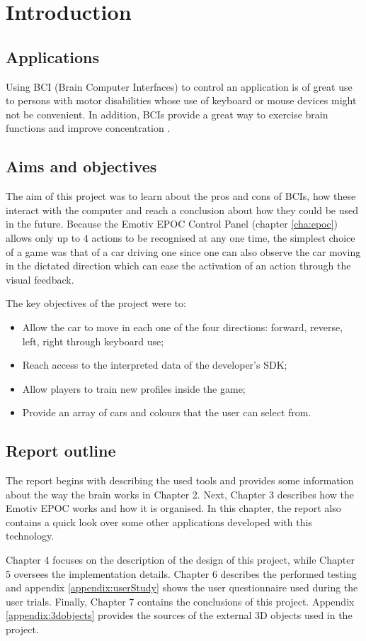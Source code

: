 \chapter{Introduction}
\label{cha:intro}

\section{Applications}

Using BCI (Brain Computer Interfaces) to control an application is of great use to persons with motor disabilities whose use of keyboard or mouse devices might not be convenient. In addition,  BCIs provide a great way to exercise brain functions and improve concentration \cite{adhd}.

\section{Aims and objectives}

The aim of this project was to learn about the pros and cons of BCIs, how these interact with the computer and reach a conclusion about how they could be used in the future. Because the Emotiv EPOC Control Panel (chapter \ref{cha:epoc}) allows only up to 4 actions to be recognised at any one time, the simplest choice of a game was that of a car driving one since one can also observe the car moving in the dictated direction which can ease the activation of an action through the visual feedback.

The key objectives of the project were to:
\begin{itemize}
	\item Allow the car to move in each one of the four directions: forward, reverse, left, right through keyboard use; 
	\item Reach access to the interpreted data of the developer's SDK;
	\item Allow players to train new profiles inside the game;
	\item Provide an array of cars and colours that the user can select from.
\end{itemize}

\section{Report outline}

The report begins with describing the used tools and provides some information about the way the brain works in Chapter 2. Next, Chapter 3 describes how the Emotiv EPOC works and how it is organised. In this chapter, the report also contains a quick look over some other applications developed with this technology.

Chapter 4 focuses on the description of the design of this project, while Chapter 5 oversees the implementation details. Chapter 6 describes the performed testing and appendix \ref{appendix:userStudy} shows the user questionnaire used during the user trials. Finally, Chapter 7 contains the conclusions of this project. Appendix \ref{appendix:3dobjects} provides the sources of the external 3D objects used in the project.